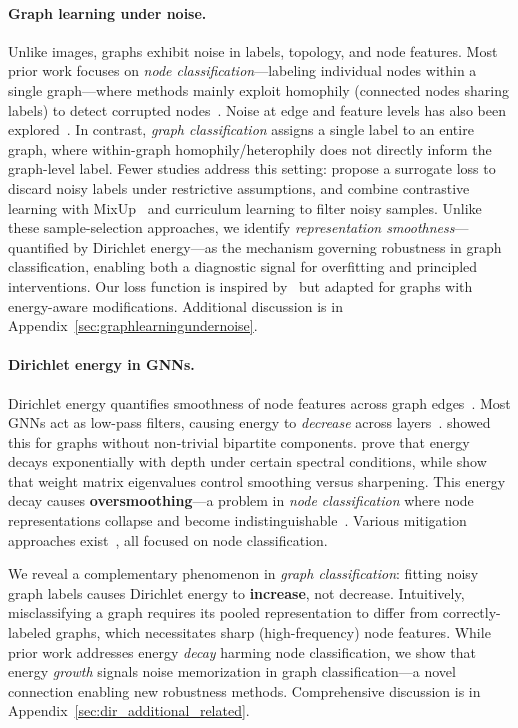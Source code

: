 \paragraph{Graph learning under noise.}
Unlike images, graphs exhibit noise in labels, topology, and node features. 
Most prior work focuses on \emph{node classification}---labeling individual nodes within a single graph---where methods mainly exploit homophily (connected nodes sharing labels) to detect corrupted nodes~\cite{graphC1, contrastivelearning5, omg7, ssl8, cl9, nrgnn11, Kang2018RobustGL}. Noise at edge and feature levels has also been explored~\cite{structuralnoise2, structuralnoise3, ssl8}.
In contrast, \emph{graph classification} assigns a single label to an entire graph, where within-graph homophily/heterophily does not directly inform the graph-level label. 
Fewer studies address this setting: \cite{graphC1} propose a surrogate loss to discard noisy labels under restrictive assumptions, and \cite{omg7} combine contrastive learning with MixUp~\cite{mixup2} and curriculum learning to filter noisy samples.
Unlike these sample-selection approaches, we identify \emph{representation smoothness}---quantified by Dirichlet energy---as the mechanism governing robustness in graph classification, enabling both a diagnostic signal for overfitting and principled interventions. Our loss function is inspired by~\cite{wani2023combining} but adapted for graphs with energy-aware modifications. Additional discussion is in Appendix~\ref{sec:graphlearningundernoise}.

\paragraph{Dirichlet energy in GNNs.}
Dirichlet energy quantifies smoothness of node features across graph edges~\cite{dirichlet}. 
Most GNNs act as low-pass filters, causing energy to \emph{decrease} across layers~\cite{nt2019revisiting, rusch2023survey}. 
\cite{nt2019revisiting} showed this for graphs without non-trivial bipartite components. 
\cite{noteonoversmoothing, oversmoothing2} prove that energy decays exponentially with depth under certain spectral conditions, while \cite{GRAFF} show that weight matrix eigenvalues control smoothing versus sharpening.
This energy decay causes \textbf{oversmoothing}---a problem in \emph{node classification} where node representations collapse and become indistinguishable~\cite{2sides}. Various mitigation approaches exist~\cite{FAGCN, zhou2021dirichlet, EEConv}, all focused on node classification.

We reveal a complementary phenomenon in \emph{graph classification}: fitting noisy graph labels causes Dirichlet energy to \textbf{increase}, not decrease. 
Intuitively, misclassifying a graph requires its pooled representation to differ from correctly-labeled graphs, which necessitates sharp (high-frequency) node features.
While prior work addresses energy \emph{decay} harming node classification, we show that energy \emph{growth} signals noise memorization in graph classification---a novel connection enabling new robustness methods.
Comprehensive discussion is in Appendix~\ref{sec:dir_additional_related}.